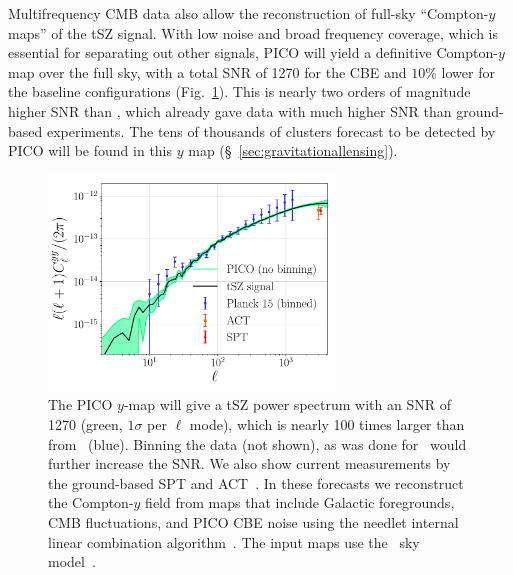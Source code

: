 \documentclass[PICOAPC.tex]{subfiles}
\begin{document}

Multifrequency \ac{CMB} data also allow the reconstruction of full-sky ``Compton-$y$ maps'' of the tSZ signal.  With low noise and broad frequency coverage, which is essential for separating out other signals, PICO will yield a definitive Compton-$y$ map over the full sky, with a total \ac{SNR} of 1270 for the CBE and $10$\% lower for the baseline configurations (Fig.~\ref{fig:PICO_tSZ_PS}). This is nearly two orders of magnitude higher \ac{SNR} than \planck , which already gave data with much higher \ac{SNR} than ground-based experiments. The tens of thousands of clusters forecast to be detected by PICO will be found in this $y$ map (\S~\ref{sec:gravitationallensing}).
\begin{figure}[h]
\hspace{-0.1in}
\parbox{3.1in}{\centerline{
\includegraphics[width=3.0in]{images/PICO_tSZ_PS_plot.pdf} } }
\hspace{0.in}
\parbox{3.4in}{
\caption{\captiontext  
The PICO $y$-map will give a tSZ power spectrum with an \ac{SNR} of 1270 (green, $1\sigma$ per $\ell$ mode), which is nearly 100 times larger than from \planck\ (blue). Binning the data (not shown), as was done for \planck\, would further increase the \ac{SNR}.  We also show current measurements by the ground-based SPT and ACT~\citep{Sievers2013,George2015}. In these forecasts we reconstruct the Compton-$y$ field from maps that include Galactic foregrounds, CMB fluctuations, and PICO CBE noise using the needlet internal linear combination algorithm~\citep{Delabrouille2009}. The input maps use the \planck~sky model~\cite{delabrouille/etal:2013}.
\label{fig:PICO_tSZ_PS} } }
\vspace{-0.2in}
\end{figure}
\end{document}
